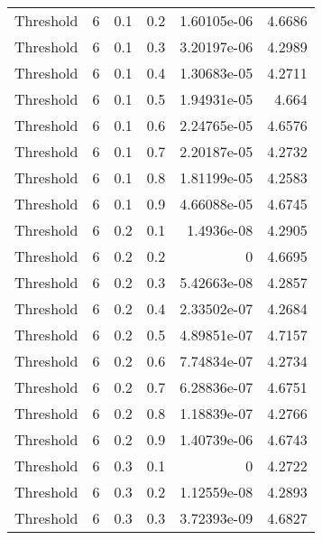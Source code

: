 \documentclass{article}
\begin{document}
\begin{longtable}[H]{lrrrrr}
 Threshold      &       6 &   0.1 &            0.2 &      1.60105e-06 &          4.6686 \\
 Threshold      &       6 &   0.1 &            0.3 &      3.20197e-06 &          4.2989 \\
 Threshold      &       6 &   0.1 &            0.4 &      1.30683e-05 &          4.2711 \\
 Threshold      &       6 &   0.1 &            0.5 &      1.94931e-05 &          4.664  \\
 Threshold      &       6 &   0.1 &            0.6 &      2.24765e-05 &          4.6576 \\
 Threshold      &       6 &   0.1 &            0.7 &      2.20187e-05 &          4.2732 \\
 Threshold      &       6 &   0.1 &            0.8 &      1.81199e-05 &          4.2583 \\
 Threshold      &       6 &   0.1 &            0.9 &      4.66088e-05 &          4.6745 \\
 Threshold      &       6 &   0.2 &            0.1 &      1.4936e-08  &          4.2905 \\
 Threshold      &       6 &   0.2 &            0.2 &      0           &          4.6695 \\
 Threshold      &       6 &   0.2 &            0.3 &      5.42663e-08 &          4.2857 \\
 Threshold      &       6 &   0.2 &            0.4 &      2.33502e-07 &          4.2684 \\
 Threshold      &       6 &   0.2 &            0.5 &      4.89851e-07 &          4.7157 \\
 Threshold      &       6 &   0.2 &            0.6 &      7.74834e-07 &          4.2734 \\
 Threshold      &       6 &   0.2 &            0.7 &      6.28836e-07 &          4.6751 \\
 Threshold      &       6 &   0.2 &            0.8 &      1.18839e-07 &          4.2766 \\
 Threshold      &       6 &   0.2 &            0.9 &      1.40739e-06 &          4.6743 \\
 Threshold      &       6 &   0.3 &            0.1 &      0           &          4.2722 \\
 Threshold      &       6 &   0.3 &            0.2 &      1.12559e-08 &          4.2893 \\
 Threshold      &       6 &   0.3 &            0.3 &      3.72393e-09 &          4.6827 \\

\end{longtable}
\end{document}
